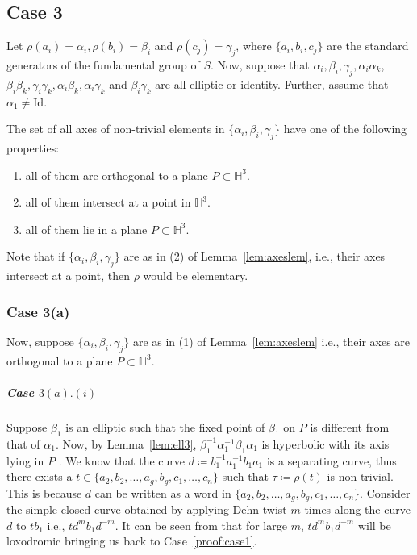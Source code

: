 \subsection{Case 3}\label{proof:case3} Let $\rho(a_i) = \alpha _i, \rho(b_i) = \beta_i$ and $\rho(c_j)= \gamma_j$, where $\{a_i,b_i,c_j\}$ are the standard generators of the fundamental group of $S$. Now, suppose that $\alpha_i, \beta_i, \gamma_j, \alpha_i \alpha_k$, $\beta_i \beta_k, \gamma_i \gamma_k, \alpha_i \beta_k, \alpha_i \gamma_k$ and $\beta_i \gamma_k$ are all elliptic or identity. Further, assume that $\alpha_1 \neq \text{Id}$.

\begin{lem}\label{lem:axeslem}\cite{GKM}
	The set of all axes of non-trivial elements in $\{\alpha_i, \beta_i, \gamma_j\}$ have one of the following properties:
	\begin{enumerate}
		\item all of them are orthogonal to a plane $P \subset \mathbb{H}^3$.
		\item all of them intersect at a point in $\mathbb{H}^3$.
		\item all of them lie in a plane $P \subset \mathbb{H}^3$.		
	\end{enumerate}
\end{lem}

Note that if $\{\alpha_i, \beta_i, \gamma_j\}$ are as in (2) of Lemma~\ref{lem:axeslem}, i.e., their axes intersect at a point, then $\rho$ would be elementary. 
 
\subsubsection{Case 3(a)} \label{proof:case3a} Now, suppose $\{\alpha_i, \beta_i, \gamma_j\}$ are as in (1) of Lemma~\ref{lem:axeslem} i.e., their axes are orthogonal to a plane $P \subset \mathbb{H}^3$.  \\

\subparagraph{Case $3(a).(i)$} \label{proof:case3ai}

Suppose $\beta_1$ is an elliptic such that the fixed point of $\beta_1$ on $P$ is different from that of $\alpha_1$. Now, by Lemma~\ref{lem:ell3}, $\beta_1^{-1}\alpha_1^{-1}\beta_1\alpha_1$ is hyperbolic with its axis lying in $P$ . We know that the curve $d \coloneqq b_1^{-1}a_1^{-1}b_1a_1$ is a separating curve, thus there exists a $t \in \{a_2,b_2, \ldots, a_g,b_g,c_1,\ldots,c_n\}$ such that $\tau \coloneqq \rho(t)$ is non-trivial. This is because $d$ can be written as a word in $\{a_2, b_2, \ldots, a_g,b_g,c_1,\ldots,c_n\}$. Consider the simple closed curve obtained by applying Dehn twist $m$ times along the curve $d$ to $tb_1$ i.e., $t d^m b_1 d^{-m}$. It can be seen from \cite[Lemma 2.1.3]{GKM} that for large $m$, $t d^m b_1 d^{-m}$ will be loxodromic bringing us back to Case~\ref{proof:case1}.  \\

